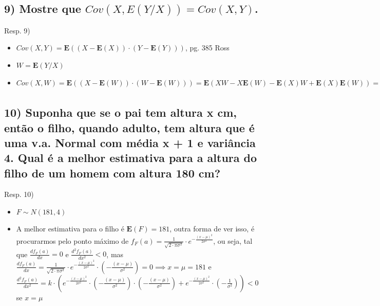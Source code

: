 \documentclass[portuguese]{article}
\begin{document}
\subsection*{\textcompwordmark{}}


\subsection*{\textmd{9) Mostre que $Cov(X,E(Y/X))=Cov(X,Y)$.}}

Resp. 9)
\begin{itemize}
\item $Cov(X,Y)=\mathbf{E}((X-\mathbf{E}(X))\cdot(Y-\mathbf{E}(Y)))$, pg.
385 Ross
\item $W=\mathbf{E}(Y/X)$
\item $Cov(X,W)=\mathbf{E}((X-\mathbf{E}(W))\cdot(W-\mathbf{E}(W)))=\mathbf{E}(XW-X\mathbf{E}(W)-\mathbf{E}(X)W+\mathbf{E}(X)\mathbf{E}(W))=\mathbf{E}(XW)-\mathbf{E}(X\mathbf{E}(W))-\mathbf{\mathbf{E}(E}(X)W)+\mathbf{E}(X)\mathbf{E}(W)=\mathbf{E}(XW)-\mathbf{E}(X\mathbf{E}(W))=\mathbf{E}(X\mathbf{E}(Y/X))-\mathbf{E}(X)\mathbf{E}(Y)=\int_{-\infty}^{\infty}x\cdot\mathbf{E}(Y/X)\cdot f_{X}(x)dx-\mathbf{E}(X)\mathbf{E}(Y)=\int_{-\infty}^{\infty}x\cdot\int_{-\infty}^{\infty}y\cdot f_{Y/X}(x,y)dy\cdot f_{X}(x)dx-\mathbf{E}(X)\mathbf{E}(Y)=\int_{-\infty}^{\infty}x\cdot\int_{-\infty}^{\infty}y\cdot\frac{f_{X,Y}(x,y)}{f_{X}(x)}dy\cdot f_{X}(x)dx-\mathbf{E}(X)\mathbf{E}(Y)=\int_{-\infty}^{\infty}\int_{-\infty}^{\infty}x\cdot y\cdot f_{X,Y}(x,y)dxdy-\mathbf{E}(X)\mathbf{E}(Y)=\mathbf{E}(XY)-\mathbf{E}(X)\mathbf{E}(Y)=Cov(X,Y)$
\end{itemize}

\subsubsection*{\textcompwordmark{}}


\subsection*{\textmd{10) Suponha que se o pai tem altura x cm, então o filho,
quando adulto, tem altura que é uma v.a. Normal com média x + 1 e
variância 4. Qual é a melhor estimativa para a altura do filho de
um homem com altura 180 cm?}}

Resp. 10)
\begin{itemize}
\item $F\sim N(181,4)$
\item A melhor estimativa para o filho é $\mathbf{E}(F)=181$, outra forma
de ver isso, é procurarmos pelo ponto máximo de $f_{F}(a)=\frac{1}{\sqrt{2\cdot\pi\sigma^{2}}}\cdot e^{-\frac{(x-\mu)^{2}}{2\sigma^{2}}}$,
ou seja, tal que $\frac{df_{F}(a)}{dx}=0$ e $\frac{d^{2}f_{F}(a)}{dx^{2}}<0$,
mas $\frac{df_{F}(a)}{dx}=\frac{1}{\sqrt{2\cdot\pi\sigma^{2}}}\cdot e^{-\frac{(x-\mu)^{2}}{2\sigma^{2}}}\cdot\left(-\frac{(x-\mu)}{\sigma^{2}}\right)=0\implies x=\mu=181$
e $\frac{d^{2}f_{F}(a)}{dx^{2}}=k\cdot(e^{-\frac{(x-\mu)^{2}}{2\sigma^{2}}}\cdot\left(-\frac{(x-\mu)}{\sigma^{2}}\right)\cdot\left(-\frac{(x-\mu)}{\sigma^{2}}\right)+e^{-\frac{(x-\mu)^{2}}{2\sigma^{2}}}\cdot\left(-\frac{1}{\sigma^{2}}\right))<0$
se $x=\mu$
\end{itemize}
\end{document}
